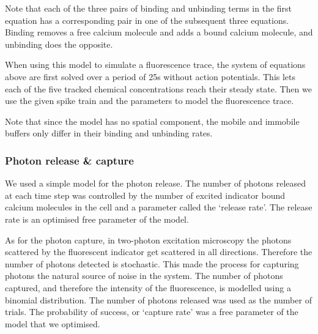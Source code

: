 Note that each of the three pairs of binding and unbinding terms in the first equation has a corresponding pair in one of the subsequent three equations. Binding removes a free calcium molecule and adds a bound calcium molecule, and unbinding does the opposite.

When using this model to simulate a fluorescence trace, the system of equations above are first solved over a period of 25s without action potentials. This lets each of the five tracked chemical concentrations reach their steady state. Then we use the given spike train and the parameters to model the fluorescence trace.

Note that since the model has no spatial component, the mobile and immobile buffers only differ in their binding and unbinding rates.

\subsubsection{Photon release \& capture}
We used a simple model for the photon release. The number of photons released at each time step was controlled by the number of excited indicator bound calcium molecules in the cell and a parameter called the `release rate'. The release rate is an optimised free parameter of the model.

As for the photon capture, in two-photon excitation microscopy the photons scattered by the fluorescent indicator get scattered in all directions. Therefore the number of photons detected is stochastic. This made the process for capturing photons the natural source of noise in the system. The number of photons captured, and therefore the intensity of the fluorescence, is modelled using a binomial distribution. The number of photons released was used as the number of trials. The probability of success, or `capture rate' was a free parameter of the model that we optimised.

